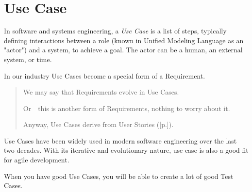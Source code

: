 \section{Use Case}
\label{sec:Use Case}

In software and systems engineering, a \emph{Use Case} is a list of steps, typically defining interactions between a role (known in Unified Modeling Language as an "actor") and a system, to achieve a goal. The actor can be a human, an external system, or time.

In our industry Use Cases become a special form of a Requirement.

\begin{quote}
We may say that Requirements evolve in Use Cases.

Or~\textemdash~this is another form of Requirements, nothing to worry about it.

Anyway, Use Cases derive from User Stories ([p.\pageref{sec:User Story}]).
\end{quote} 

Use Cases have been widely used in modern software engineering over the last two decades. With its iterative and evolutionary nature, use case is also a good fit for agile development.

When you have good Use Cases, you will be able to create a lot of good Test Cases.

